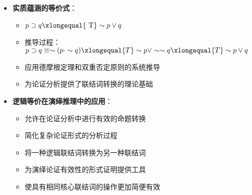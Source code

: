 \begin{center}
{{\begin{itemize}
\begin{itemize}
    \begin{itemize}
    \item "并非（A或B）"等价于"（非A）且（非B）"
    \item 例子："并非（下雨或下雪）"="不下雨且不下雪"
    \end{itemize}
  \item \textbf{第二德摩根定理}：$\sim(p \cdot q) \xlongequal{\mathrm{~T}} \sim p \vee \sim q$
    \begin{itemize}
    \item "并非（A且B）"等价于"（非A）或（非B）"
    \item 例子："并非（既聪明又勤奋）"="不聪明或不勤奋"
    \end{itemize}
  \item \textbf{历史与理论价值}：
    \begin{itemize}
    \item 奥古斯塔·德摩根（1806-1871）的贡献
    \item 现代符号逻辑发展的里程碑
    \item 布尔代数的基础，逻辑电路设计的理论基础
    \item 揭示合取和析取的对偶关系
    \end{itemize}
  \end{itemize}
\item \textbf{实质蕴涵的等价式}：
  \begin{itemize}
  \item $p \supset q \xlongequal{\mathrm{~T}} \sim p \vee q$
  \item 推导过程：$p \supset q \equiv \sim(p \cdot \sim q) \xlongequal{T} \sim p \vee \sim \sim q \xlongequal{T} \sim p \vee q$
  \item 应用德摩根定理和双重否定原则的系统推导
  \item 为论证分析提供了联结词转换的理论基础
  \end{itemize}
\item \textbf{逻辑等价在演绎推理中的应用}：
  \begin{itemize}
  \item 允许在论证分析中进行有效的命题转换
  \item 简化复杂论证形式的分析过程
  \item 将一种逻辑联结词转换为另一种联结词
  \item 为演绎论证有效性的形式证明提供工具
  \item 使具有相同核心联结词的操作更加简便有效
  \end{itemize}
\end{itemize}
}}
\end{center}